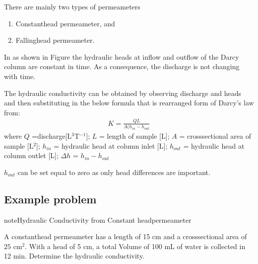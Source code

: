 \documentclass[letterpaper,10pt,english]{jupyterBook}
\let\sphinxpxdimen\pdfpxdimen\else\newdimen\sphinxpxdimen
\begin{document}
\noindent{\hspace*{\fill}\sphinxincludegraphics[width=200\sphinxpxdimen]{{L4_f4}.png}\hspace*{\fill}}

\sphinxAtStartPar
There are mainly two types of permeameters
\begin{enumerate}
%
\item {} 
\sphinxAtStartPar
Constant\sphinxhyphen{}head permeameter, and

\item {} 
\sphinxAtStartPar
Falling\sphinxhyphen{}head permeameter.

\end{enumerate}

\sphinxAtStartPar
In  as
shown in Figure the hydraulic heads at inflow and outflow of the Darcy column are
constant in time. As a consequence, the discharge is not changing with time.

\noindent{\hspace*{\fill}\sphinxincludegraphics[height=200\sphinxpxdimen]{{L4_f5}.png}\hspace*{\fill}}

\sphinxAtStartPar
The hydraulic conductivity can be obtained by observing discharge and heads and then
substituting in the below formula that is rearranged form of Darcy’s law from:
\begin{equation*}
\begin{split}
K = \frac{QL}{A(h_{in}- h_{out}}
\end{split}
\end{equation*}
\sphinxAtStartPar
where \(Q\) =discharge{[}L\(^3\)T\(^{-1}\){]};
\(L\) = length of sample {[}L{]};  \(A\) = cross\sphinxhyphen{}sectional area of sample {[}L\(^2\){]}; 
\(h_{in}\) = hydraulic head at column inlet {[}L{]};
\(h_{out}\) = hydraulic head at column outlet {[}L{]};
\(\Delta h\) = \(h_{in} - h_{out}\)

\sphinxAtStartPar
\(h_{out}\) can be set equal to zero as only head differences are important.


\subsection{Example problem}
\label{\detokenize{content/flow/L4/14_darcy_law_K:id3}}
\begin{sphinxadmonition}{note}{Hydraulic Conductivity from Constant head\sphinxhyphen{}permeameter}

\sphinxAtStartPar
A constant\sphinxhyphen{}head permeameter has a length of 15 cm and a cross\sphinxhyphen{}sectional area of \(25\) cm\(^2\). With a head of 5 cm, a total Volume of 100 mL of water is collected in 12 min. Determine the hydraulic conductivity.
\end{sphinxadmonition}
\end{document}
